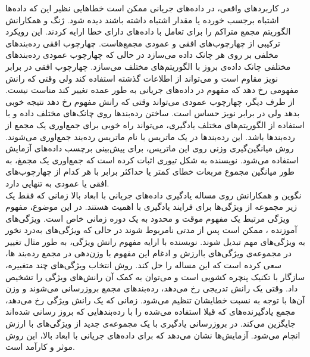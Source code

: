 در کاربردهای واقعی، در داده‌های جریانی ممکن است خطاهایی نظیر این که داده‌ها اشتباه برجسب خورده‌ یا مقدار اشتباه داشته باشند دیده شود. ژنگ
و همکارانش الگوریتم مجمع متراکم را برای تعامل با داده‌های دارای خطا ارایه کردند. این رویکرد ترکیبی از چهارچوب‌های افقی و عمودی مجمع‌هاست. چهارچوب افقی رده‌بندهای مخلفی بر روی هر چانک داده می‌سازد در حالی که چهارچوب عمودی رده‌بندهای مختلفی چانک داده‌ی بروز با الگوریتم‌های مختلف می‌سازد. چهارچوب افقی در برابر نویز مقاوم است و می‌تواند از اطلاعات گذشته استفاده کند ولی وقتی که رانش مفهومی رخ دهد که مفهوم در داده‌های جریانی به طور عمده تغییر کند مناست نیست. از طرف دیگر، چهارچوب عمودی می‌تواند وقتی که رانش مفهوم رخ دهد نتیجه خوبی بدهد ولی در برابر نویز حساس است. ساختن رده‌بندها روی چانک‌های مختلف داده و با استفاده از الگوریتم‌های مختلف یادگیری، می‌تواند راه خوبی برای جمع‌اوری یک مجمع از رده‌بندها باشد. این رده‌بندها در یک ماتریس با نام ماتریس رده‌بند
جمع‌اوری می‌شوند. روش میانگین‌گیری وزنی روی این ماتریس، برای پیش‌بینی برچسب داده‌های آزمایش استفاده می‌شود. نویسنده به شکل تیوری اثبات کرده است که جمع‌‌اوری یک مجمغ، به طور میانگین مجموع مربعات خطای کمتر یا حداکثر برابر با هر کدام از چهارچوب‌های افقی یا عمودی به تنهایی دارد.
\\


نگوین
و همکارانش روی مساله یادگیری داده‌های جریانی با ابعاد بالا زمانی که فقط یک زیر مجموعه از ویژگی‌ها برای فرایند یادگیری با اهمیت هستند. در این موضوع، مفهوم ویژگی‌ مرتبط یک مفهوم موقت و محدود به یک دوره زمانی خاص است. ویژگی‌های آموزنده
، ممکن است پس از مدتی نامربوط شوند در حالی که ویژگی‌های به‌درد نخور به ویژگی‌های مهم تبدیل شوند. نویسنده با ارایه مفهوم رانش ویژگی، به طور مثال تغییر در مجموعه‌ی ویژگی‌های باارزش و ادغام این مفهوم با وزن‌دهی در مجمع رده‌بند ها، سعی کرده است که این مساله را حل کند. روش انتخاب ویژگی‌های چند متغییره، سازگار با تکنیک پنچره کشویی است و می‌توان به کمک آن رانش‌های ویژگی را تشخیص داد.
وقتی یک رانش تدریجی رخ‌ می‌دهد، رده‌بندهای مجمع بروزرسانی می‌شوند و وزن آن‌ها با توجه به نسبت خطایشان تنظیم می‌شود. زمانی که یک رانش ویژگی رخ می‌دهد، مجمع یادگیرنده‌های که قبلا استفاده می‌شده را با رده‌بندهایی که بروز رسانی شده‌اند جایگزین می‌کند. در بروزرسانی یادگیری با یک مجموعه‌ی جدید از ویژگی‌های با ارزش انچام می‌شود. آزمایش‌ها نشان می‌دهد که برای داده‌های جریانی با ابعاد بالا، این روش موثر و کارآمد است.

